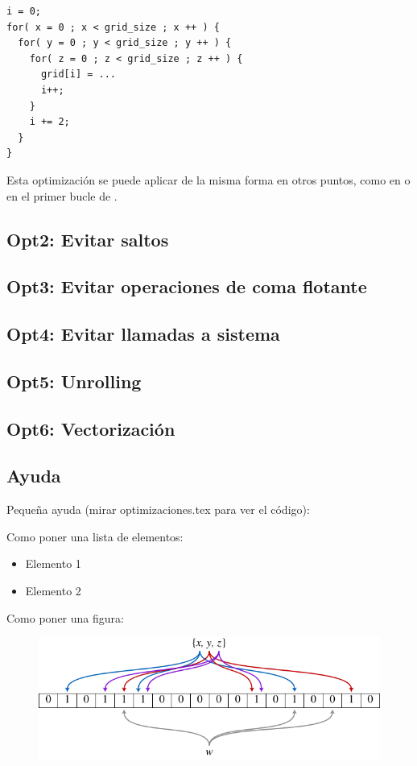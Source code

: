 \begin{verbatim}
i = 0;
for( x = 0 ; x < grid_size ; x ++ ) {
  for( y = 0 ; y < grid_size ; y ++ ) {
    for( z = 0 ; z < grid_size ; z ++ ) {
      grid[i] = ...
      i++;
    }
    i += 2;
  }
}
\end{verbatim}

Esta optimizaci\'{o}n se puede aplicar de la misma forma en otros puntos, como
en  o en el primer bucle de
.

\subsection{Opt2: Evitar saltos}

\subsection{Opt3: Evitar operaciones de coma flotante}

\subsection{Opt4: Evitar llamadas a sistema}

\subsection{Opt5: Unrolling}

\subsection{Opt6: Vectorizaci\'{o}n}

\subsection{Ayuda}

Peque\~{n}a ayuda (mirar optimizaciones.tex para ver el c\'{o}digo):

Como poner una lista de elementos:
\begin{itemize}
   \item Elemento 1
   \item Elemento 2
\end{itemize}

Como poner una figura:
\begin{figure}[ht]
   \centering
   \includegraphics[keepaspectratio=true,width=.6\textwidth]{figures/muestra}
\end{figure}

